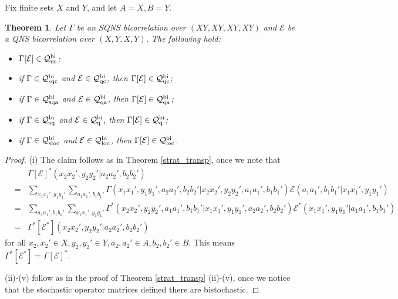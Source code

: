 \documentclass[11pt]{amsart}
\newtheorem{theorem}{Theorem}[section]
\newcommand{\cl}[1]{\mathcal{#1}}
\begin{document}
Fix finite sets $X$ and $Y$, and let $A = X, B = Y$.
\begin{theorem}\label{bi_strat_transp}
Let $\Gamma$ be an SQNS bicorrelation over $(XY, XY, XY, XY)$ and $\cl{E}$ be a QNS bicorrelation over $(X, Y, X, Y)$. The following hold:
\begin{itemize}
	\item[(i)] $\Gamma[\cl{E}] \in \cl{Q}_{\rm ns}^{\rm bi}$;
	\item[(ii)] if $\Gamma \in \cl{Q}_{\rm sqc}^{\rm bi}$ and $\cl{E} \in \cl{Q}_{\rm qc}^{\rm bi}$, then $\Gamma[\cl{E}] \in \cl{Q}_{\rm qc}^{\rm bi}$;
	\item[(iii)] if $\Gamma \in \cl{Q}_{\rm sqa}^{\rm bi}$ and $\cl{E} \in \cl{Q}_{\rm qa}^{\rm bi}$, then $\Gamma[\cl{E}] \in \cl{Q}_{\rm qa}^{\rm bi}$;
	\item[(iv)] if $\Gamma \in \cl{Q}_{\rm sq}^{\rm bi}$ and $\cl{E} \in \cl{Q}_{\rm q}^{\rm bi}$, then $\Gamma[\cl{E}] \in \cl{Q}_{\rm q}^{\rm bi}$;
	\item[(v)] if $\Gamma \in \cl{Q}_{\rm sloc}^{\rm bi}$ and $\cl{E} \in \cl{Q}_{\rm loc}^{\rm bi}$, then $\Gamma[\cl{E}] \in \cl{Q}_{\rm loc}^{\rm bi}$.
\end{itemize}
\end{theorem}
\begin{proof}
(i) The claim follows as in Theorem \ref{strat_transp}, once we note that
\begin{eqnarray*}
& &
	\Gamma[\cl{E}]^{*}(x_{2}x_{2}', y_{2}y_{2}'|a_{2}a_{2}', b_{2}b_{2}') \\
& = &
\sum\limits_{x_{1}x_{1}', y_{1}y_{1}'}\sum\limits_{a_{1}a_{1}', b_{1}b_{1}'}\Gamma(x_{1}x_{1}', y_{1}y_{1}', a_{2}a_{2}', b_{2}b_{2}'|x_{2}x_{2}', y_{2}y_{2}', a_{1}a_{1}', b_{1}b_{1}')\cl{E}(a_{1}a_{1}', b_{1}b_{1}'|x_{1}x_{1}', y_{1}y_{1}') \\
& = &
\sum\limits_{a_{1}a_{1}', b_{1}b_{1}'}\sum\limits_{x_{1}x_{1}', y_{1}y_{1}'}\Gamma^{*}(x_{2}x_{2}', y_{2}y_{2}', a_{1}a_{1}', b_{1}b_{1}'|x_{1}x_{1}', y_{1}y_{1}', a_{2}a_{2}', b_{2}b_{2}')\cl{E}^{*}(x_{1}x_{1}', y_{1}y_{1}'|a_{1}a_{1}', b_{1}b_{1}') \\
& = &
\Gamma^{*}[\cl{E}^{*}](x_{2}x_{2}', y_{2}y_{2}'|a_{2}a_{2}', b_{2}b_{2}')
\end{eqnarray*}
\noindent for all $x_{2}, x_{2}' \in X, y_{2}, y_{2}' \in Y, a_{2}, a_{2}' \in A, b_{2}, b_{2}' \in B$. This means $\Gamma^{*}[\cl{E}^{*}] = \Gamma[\cl{E}]^{*}$.

(ii)-(v) follow as in the proof of Theorem \ref{strat_transp} (ii)-(v), once we notice that the stochastic operator matrices defined there are bistochastic. 
\end{proof}
\end{document}
